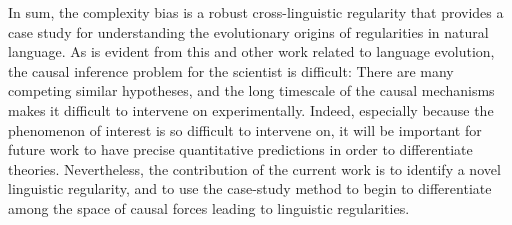 In sum, the complexity bias is a robust cross-linguistic regularity that provides a case study for understanding the evolutionary origins of regularities in natural language. As is evident from this and other work related to language evolution, the causal inference problem for the scientist is difficult: There are many competing similar hypotheses, and the long timescale of the causal mechanisms makes it difficult to intervene on experimentally. Indeed, especially because the phenomenon of interest is so difficult to intervene on, it will be important for future work to have precise quantitative predictions in order to differentiate theories. Nevertheless, the contribution of the current work is to identify a novel linguistic regularity, and to  use the case-study method to begin to differentiate among the space of causal forces leading to linguistic regularities.


 





   


 











   